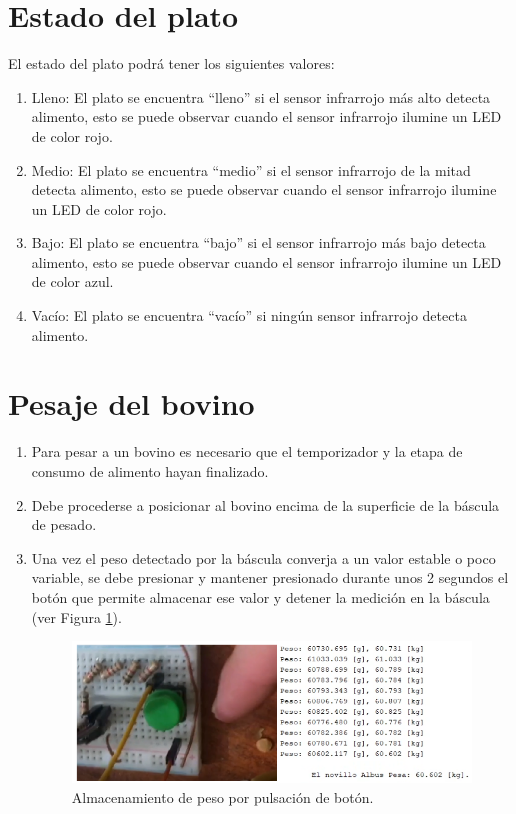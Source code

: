 \section{Estado del plato}

El estado del plato podrá tener los siguientes valores:
\begin{enumerate}
    \item Lleno: El plato se encuentra ``lleno'' si el sensor infrarrojo más alto detecta alimento, esto se puede observar cuando el sensor infrarrojo ilumine un LED de color rojo.
    \item Medio: El plato se encuentra ``medio'' si el sensor infrarrojo de la mitad detecta alimento, esto se puede observar cuando el sensor infrarrojo ilumine un LED de color rojo.
    \item Bajo: El plato se encuentra ``bajo'' si el sensor infrarrojo más bajo detecta alimento, esto se puede observar cuando el sensor infrarrojo ilumine un LED de color azul.
    \item Vacío: El plato se encuentra ``vacío'' si ningún sensor infrarrojo detecta alimento.
\end{enumerate}

\section{Pesaje del bovino}

\begin{enumerate}
    \item Para pesar a un bovino es necesario que el temporizador y la etapa de consumo de alimento hayan finalizado.
    \item Debe procederse a posicionar al bovino encima de la superficie de la báscula de pesado.
    \item Una vez el peso detectado por la báscula converja a un valor estable o poco variable, se debe presionar y mantener presionado durante unos 2 segundos el botón que permite almacenar ese valor y detener la medición en la báscula (ver Figura \ref{pesookpng}).
    \begin{figure}[H]
        \centering
        \includegraphics[scale=0.7]{img/pesook.png}
        \caption{Almacenamiento de peso por pulsación de botón.}
        \label{pesookpng}
    \end{figure}
\end{enumerate}
  
